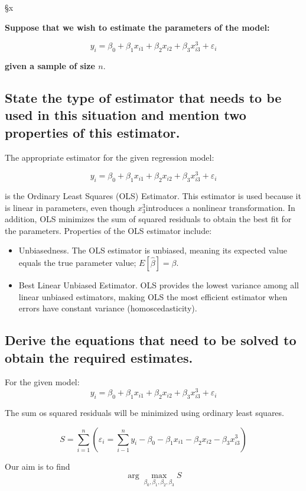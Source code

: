 §x\documentclass[]{article}
\begin{document}
\textbf{Suppose that we wish to estimate the parameters of the model:}

$$
y_i = \beta_0 + \beta_1 x_{i1} + \beta_2 x_{i2} + \beta_3 x_{i3}^3 + \varepsilon_i
$$

\noindent \textbf{given a sample of size $n$}.

\subsection{State the type of estimator that needs to be used in this situation and mention two properties of this estimator.}

The appropriate estimator for the given regression model:

$$
y_i = \beta_0 + \beta_1 x_{i1} + \beta_2 x_{i2} + \beta_3 x_{i3}^3 + \varepsilon_i
$$


is the Ordinary Least Squares (OLS) Estimator. This estimator is used because it is linear in parameters, even though $x_3^3$introduces a nonlinear transformation. In addition, OLS minimizes the sum of squared residuals to obtain the best fit for the parameters. Properties of the OLS estimator include:

\begin{itemize}
	\item Unbiasedness. The OLS estimator is unbiased, meaning its expected value equals the true parameter value; $E[\hat{\beta}] = \beta$.
	\item Best Linear Unbiased Estimator. OLS provides the lowest variance among all linear unbiased estimators, making OLS the most efficient estimator when errors have constant variance (homoscedasticity).
\end{itemize}



\subsection{Derive the equations that need to be solved to obtain the required estimates.}


\noindent For the given model:
$$
y_i = \beta_0 + \beta_1 x_{i1} + \beta_2 x_{i2} + \beta_3 x_{i3}^3 + \varepsilon_i
$$

\noindent The sum os squared residuals will be minimized using ordinary least squares.

$$
S = \sum_{i=1}^{n} (\varepsilon_i = \sum_{i-1}^{n} y_i - \beta_0 - \beta_1 x_{i1} - \beta_2 x_{i2} - \beta_3 x_{i3}^3)
$$

\noindent Our aim is to find $$\arg \max_{\beta_0, \beta_1, \beta_2, \beta_3} S$$ 
\end{document}
